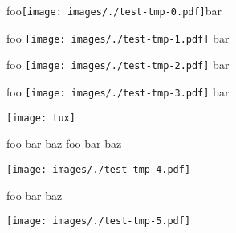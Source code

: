 \documentclass[12pt]{article}
\begin{document}
foo\texttt{[image: images/./test-tmp-0.pdf]}bar

foo
\texttt{[image: images/./test-tmp-1.pdf]}
bar

foo
\texttt{[image: images/./test-tmp-2.pdf]}
bar

\clearpage
foo
\texttt{[image: images/./test-tmp-3.pdf]}
bar

\texttt{[image: tux]}%

\clearpage

foo bar baz foo bar baz
 
\texttt{[image: images/./test-tmp-4.pdf]}

foo bar baz

\texttt{[image: images/./test-tmp-5.pdf]}
\end{document}
